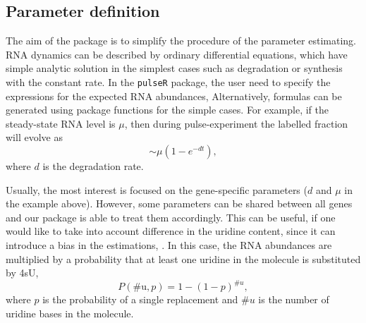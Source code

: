 \subsection{Parameter definition}
\par The aim of the package is to simplify the procedure of the parameter estimating.
RNA dynamics can be described by ordinary differential equations,
which have simple analytic solution 
in the simplest cases such as degradation or synthesis with 
the constant rate. In the \verb|pulseR| package,
the user need to specify the expressions for the expected RNA abundances,
Alternatively, formulas can be generated using package functions for the 
simple cases. For example, if the steady-state RNA level is $\mu$, then
during pulse-experiment the labelled fraction will evolve as
\begin{equation}
 [\text{Labelled}] \sim \mu (1 - e^{-dt}),
\end{equation}
where $d$ is the degradation rate.
\par 
Usually, the most interest is focused on the gene-specific parameters ($d$ and $\mu$
in the example above). However, some parameters can be shared between all genes and
our package is able to treat them accordingly. This can be useful, if 
one would like to take into account difference in the uridine content, since
it can introduce a bias in the estimations, \citep{miller2011dynamic,
schwalb2012measurement}. In this case, the RNA abundances are multiplied by 
a probability that at least one uridine in the molecule is substituted by 4sU,
\begin{equation}
P(\text{\#u}, p) = 1-(1-p)^{\text{\#}u},
\end{equation}
where $p$ is the probability of a single replacement and  
 $\text{\#}u$ is the number of uridine bases in the molecule.
\par 
